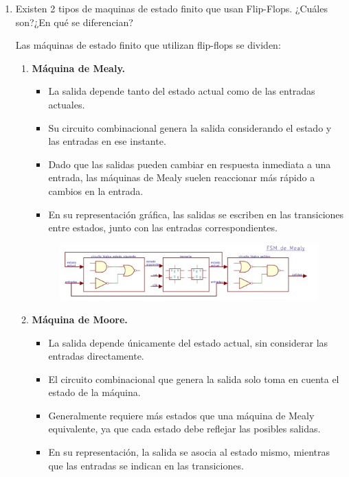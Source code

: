 \documentclass[12pt,letterpaper]{article}
\begin{document}
\begin{enumerate}
  \item Existen 2 tipos de maquinas de estado finito que usan Flip-Flops. ¿Cuáles son?¿En qué se diferencian?
    \bigskip

    Las máquinas de estado finito que utilizan flip-flops se dividen:
    
    \begin{enumerate}[label=\arabic*)]
    \item \textbf{Máquina de Mealy.}

      \begin{itemize}
      \item La salida depende tanto del estado actual como de las entradas actuales.
      \item Su circuito combinacional genera la salida considerando el estado y las entradas en ese instante.
      \item Dado que las salidas pueden cambiar en respuesta inmediata a una entrada, las máquinas de Mealy suelen reaccionar más rápido a cambios en la entrada.
      \item En su representación gráfica, las salidas se escriben en las transiciones entre estados, junto con las entradas correspondientes.
      \end{itemize}

      \begin{figure}[H]
        \centering
        \includegraphics[width=1.1\textwidth]{imagen2.png}
      \end{figure}
      
    \item \textbf{Máquina de Moore.}
      \begin{itemize}
      \item La salida depende únicamente del estado actual, sin considerar las entradas directamente.
      \item El circuito combinacional que genera la salida solo toma en cuenta el estado de la máquina.
      \item Generalmente requiere más estados que una máquina de Mealy equivalente, ya que cada estado debe reflejar las posibles salidas.
      \item En su representación, la salida se asocia al estado mismo, mientras que las entradas se indican en las transiciones.
      \end{itemize}


\end{enumerate}
\end{enumerate}
\end{document}
